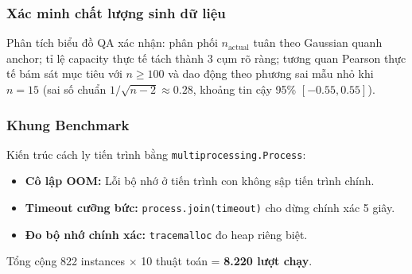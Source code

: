 \begin{table}[H]
\centering
\caption{Cấu hình 4 kịch bản kiểm thử.}
\label{tab:scenarios}
\end{table}

\subsubsection{Xác minh chất lượng sinh dữ liệu}

Phân tích biểu đồ QA xác nhận: phân phối $n_{\text{actual}}$ tuân theo Gaussian quanh anchor; tỉ lệ capacity thực tế tách thành 3 cụm rõ ràng; tương quan Pearson thực tế bám sát mục tiêu với $n\ge 100$ và dao động theo phương sai mẫu nhỏ khi $n=15$ (sai số chuẩn $1/\sqrt{n-2}\approx 0.28$, khoảng tin cậy 95\% $[-0.55, 0.55]$).

\subsubsection{Khung Benchmark}

Kiến trúc cách ly tiến trình bằng \texttt{multiprocessing.Process}:
\begin{itemize}[leftmargin=*]
    \item \textbf{Cô lập OOM:} Lỗi bộ nhớ ở tiến trình con không sập tiến trình chính.
    \item \textbf{Timeout cưỡng bức:} \texttt{process.join(timeout)} cho dừng chính xác 5 giây.
    \item \textbf{Đo bộ nhớ chính xác:} \texttt{tracemalloc} đo heap riêng biệt.
\end{itemize}

Tổng cộng 822 instances $\times$ 10 thuật toán = \textbf{8.220 lượt chạy}.


